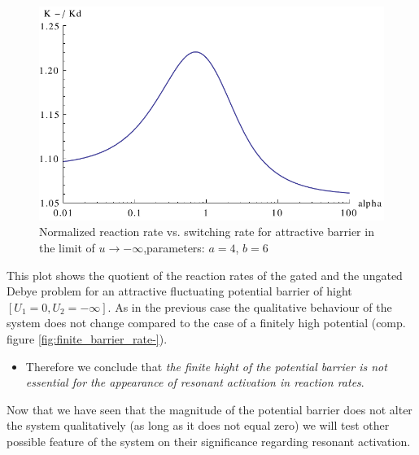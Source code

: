 \par
\begin{minipage}[t]{0.7 \textwidth}
    \begin{figure}[H]
        \includegraphics[width = 1 \textwidth]{plots/K-.pdf}
    \caption{Normalized reaction rate vs. switching rate for \newline attractive barrier in the limit of $u \rightarrow - \infty$,\newline parameters: $a = 4$, $b = 6$}
    \end{figure}
\end{minipage}\begin{minipage}[t]{0.3 \textwidth}
    This plot shows the quotient of the reaction rates of the gated and the ungated Debye problem for an attractive fluctuating potential barrier of hight $[U_1 = 0, U_2 = -\infty]$. As in the previous case the qualitative behaviour of the system does not change compared to the case of a finitely high potential (comp. figure \ref{fig:finite_barrier_rate-}). 
\end{minipage}
\begin{itemize}
    \item Therefore we conclude that \textit{the finite hight of the potential barrier is not essential for the appearance of resonant activation in reaction rates}.
\end{itemize}
Now that we have seen that the magnitude of the potential barrier does not alter the system qualitatively (as long as it does not equal zero) we will test other possible feature of the system on their significance regarding resonant activation. 
